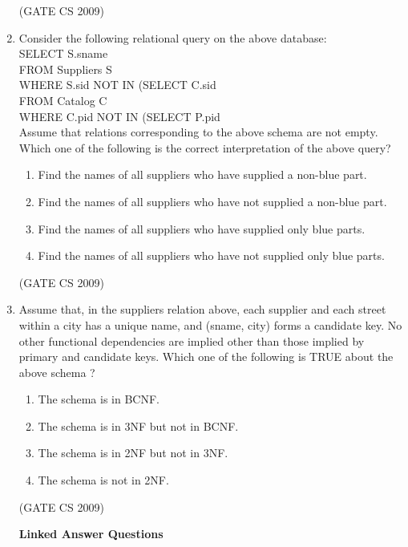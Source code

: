 \documentclass[a4paper, 11pt]{article}
\begin{document}
\begin{enumerate}
    \hfill (GATE CS 2009)

    \item Consider the following relational query on the above database:\\
    SELECT S.sname\\
    FROM Suppliers S\\
    WHERE S.sid NOT IN (SELECT C.sid\\
    \hspace*{4cm}FROM Catalog C\\
    \hspace*{4cm}WHERE C.pid NOT IN (SELECT P.pid\\
    Assume that relations corresponding to the above schema are not empty. Which one of the following is the correct interpretation of the above query?\\
    \begin{enumerate}
        \item Find the names of all suppliers who have supplied a non-blue part.
        \item  Find the names of all suppliers who have not supplied a non-blue part.
        \item Find the names of all suppliers who have supplied only blue parts.
        \item Find the names of all suppliers who have not supplied only blue parts.
    \end{enumerate}
    
    \hfill (GATE CS 2009)
    
    \item Assume that, in the suppliers relation above, each supplier and each street within a city has a unique name, and (sname, city) forms a candidate key. No other functional dependencies are implied other than those implied by primary and candidate keys. Which one of the following is TRUE about the above schema ?
    \begin{enumerate} [label=(\Alph*)]
        \item The schema is in BCNF.
        \item The schema is in 3NF but not in BCNF.
        \item The schema is in 2NF but not in 3NF.
        \item The schema is not in 2NF.
    \end{enumerate}
    \hfill (GATE CS 2009)
    
    \textbf{{\LARGE Linked Answer Questions}} \\
    

\end{enumerate}
\end{document}
